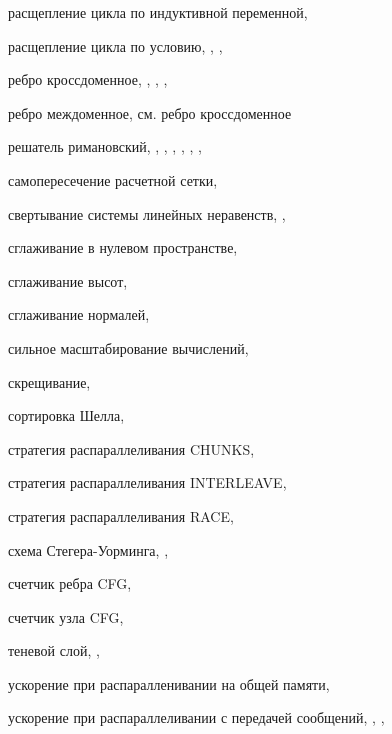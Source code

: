 расщепление цикла по индуктивной переменной, \pageref{term:loop_split_by_inductive}

расщепление цикла по условию, \pageref{term:loop_split_by_cond}, \pageref{term:loop_split_by_cond2}, \pageref{term:loop_split_by_cond3}

ребро кроссдоменное, \pageref{term:edge_cross}, \pageref{term:edge_cross2}, \pageref{term:edge_cross3}, \pageref{term:edge_cross4}

ребро междоменное, см. ребро кроссдоменное

решатель римановский, \pageref{term:riemann_solver}, \pageref{term:riemann_solver2}, \pageref{term:riemann_solver3}, \pageref{term:riemann_solver4}, \pageref{term:riemann_solver5}, \pageref{term:riemann_solver6}, \pageref{term:riemann_solver7}

самопересечение расчетной сетки, \pageref{term:mesh_self_intersect}

свертывание системы линейных неравенств, \pageref{term:method_svert_sys_neravenstv}, \pageref{term:method_svert_sys_neravenstv2}

сглаживание в нулевом пространстве, \pageref{term:smooth_null}

сглаживание высот, \pageref{term:smooth_height}

сглаживание нормалей, \pageref{term:smooth_norm}

сильное масштабирование вычислений, \pageref{term:strong_scale}

скрещивание, \pageref{term:crossover}

сортировка Шелла, \pageref{term:shell_sort}

стратегия распараллеливания CHUNKS, \pageref{term:parallel_strategy_chunks}

стратегия распараллеливания INTERLEAVE, \pageref{term:parallel_strategy_interleave}

стратегия распараллеливания RACE, \pageref{term:parallel_strategy_race}

схема Стегера-Уорминга, \pageref{term:steger_warming_scheme}, \pageref{term:steger_warming_scheme2}

счетчик ребра CFG, \pageref{term:counter_edge}

счетчик узла CFG, \pageref{term:counter_node}

теневой слой, \pageref{term:block_shadow_layer}, \pageref{term:block_shadow_layer2}

ускорение при распаралленивании на общей памяти, \pageref{term:shr_speedup}

ускорение при распараллеливании с передачей сообщений, \pageref{term:msg_speedup}, \pageref{term:msg_speedup2}, \pageref{term:msg_speedup3}

